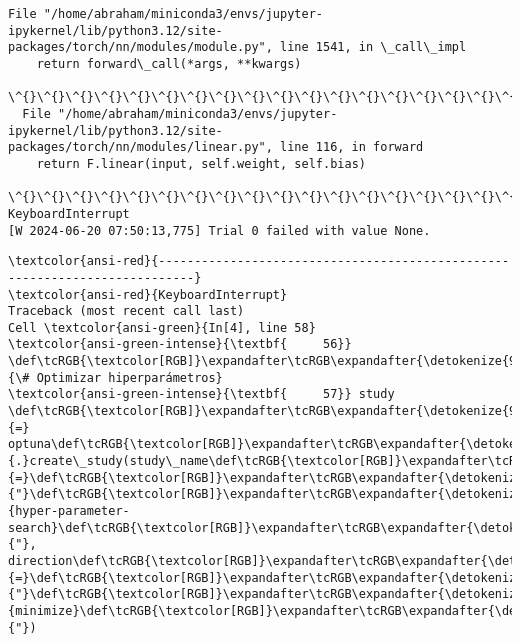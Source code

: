 \documentclass[11pt]{article}
\begin{document}
\begin{Verbatim}[commandchars=\\\{\}]
  File "/home/abraham/miniconda3/envs/jupyter-ipykernel/lib/python3.12/site-
packages/torch/nn/modules/module.py", line 1541, in \_call\_impl
    return forward\_call(*args, **kwargs)
           \^{}\^{}\^{}\^{}\^{}\^{}\^{}\^{}\^{}\^{}\^{}\^{}\^{}\^{}\^{}\^{}\^{}\^{}\^{}\^{}\^{}\^{}\^{}\^{}\^{}\^{}\^{}\^{}\^{}
  File "/home/abraham/miniconda3/envs/jupyter-ipykernel/lib/python3.12/site-
packages/torch/nn/modules/linear.py", line 116, in forward
    return F.linear(input, self.weight, self.bias)
           \^{}\^{}\^{}\^{}\^{}\^{}\^{}\^{}\^{}\^{}\^{}\^{}\^{}\^{}\^{}\^{}\^{}\^{}\^{}\^{}\^{}\^{}\^{}\^{}\^{}\^{}\^{}\^{}\^{}\^{}\^{}\^{}\^{}\^{}\^{}\^{}\^{}\^{}\^{}
KeyboardInterrupt
[W 2024-06-20 07:50:13,775] Trial 0 failed with value None.
    \end{Verbatim}

    \begin{Verbatim}[commandchars=\\\{\}, frame=single, framerule=2mm, rulecolor=\color{outerrorbackground}]
\textcolor{ansi-red}{---------------------------------------------------------------------------}
\textcolor{ansi-red}{KeyboardInterrupt}                         Traceback (most recent call last)
Cell \textcolor{ansi-green}{In[4], line 58}
\textcolor{ansi-green-intense}{\textbf{     56}} \def\tcRGB{\textcolor[RGB]}\expandafter\tcRGB\expandafter{\detokenize{95,135,135}}{\# Optimizar hiperparámetros}
\textcolor{ansi-green-intense}{\textbf{     57}} study \def\tcRGB{\textcolor[RGB]}\expandafter\tcRGB\expandafter{\detokenize{98,98,98}}{=} optuna\def\tcRGB{\textcolor[RGB]}\expandafter\tcRGB\expandafter{\detokenize{98,98,98}}{.}create\_study(study\_name\def\tcRGB{\textcolor[RGB]}\expandafter\tcRGB\expandafter{\detokenize{98,98,98}}{=}\def\tcRGB{\textcolor[RGB]}\expandafter\tcRGB\expandafter{\detokenize{175,0,0}}{"}\def\tcRGB{\textcolor[RGB]}\expandafter\tcRGB\expandafter{\detokenize{175,0,0}}{hyper-parameter-search}\def\tcRGB{\textcolor[RGB]}\expandafter\tcRGB\expandafter{\detokenize{175,0,0}}{"}, direction\def\tcRGB{\textcolor[RGB]}\expandafter\tcRGB\expandafter{\detokenize{98,98,98}}{=}\def\tcRGB{\textcolor[RGB]}\expandafter\tcRGB\expandafter{\detokenize{175,0,0}}{"}\def\tcRGB{\textcolor[RGB]}\expandafter\tcRGB\expandafter{\detokenize{175,0,0}}{minimize}\def\tcRGB{\textcolor[RGB]}\expandafter\tcRGB\expandafter{\detokenize{175,0,0}}{"})

\end{Verbatim}
\end{document}
